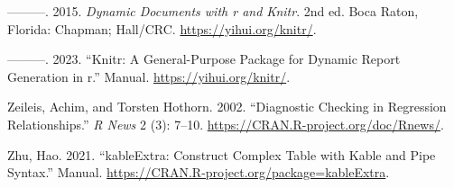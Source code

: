 \documentclass[
  letterpaper,
  paper =a4,
  twoside,
  openright,
  headsepline,
  footsepline,
  listof = totocnumbered,
  chapterprefix = true,
  firstiscover,
  parskip = full*]{scrbook}
\newlength{\cslhangindent}
\newenvironment{CSLReferences}[2] %
 {\begin{list}{}{%
  \setlength{\itemindent}{0pt}
  \setlength{\leftmargin}{0pt}
  \setlength{\parsep}{0pt}
  \ifodd #1
   \setlength{\leftmargin}{\cslhangindent}
   \setlength{\itemindent}{-1\cslhangindent}
  \fi
  \setlength{\itemsep}{#2\baselineskip}}}
 {\end{list}}
\begin{document}
\begin{CSLReferences}{1}{0}
---------. 2015. \emph{Dynamic Documents with r and Knitr}. 2nd ed. Boca
Raton, Florida: Chapman; Hall/{CRC}. \url{https://yihui.org/knitr/}.

---------. 2023. {``Knitr: A General-Purpose Package for Dynamic Report
Generation in r.''} Manual. \url{https://yihui.org/knitr/}.

Zeileis, Achim, and Torsten Hothorn. 2002. {``Diagnostic Checking in
Regression Relationships.''} \emph{R News} 2 (3): 7--10.
\url{https://CRAN.R-project.org/doc/Rnews/}.

Zhu, Hao. 2021. {``{kableExtra}: Construct Complex Table with Kable and
Pipe Syntax.''} Manual.
\url{https://CRAN.R-project.org/package=kableExtra}.

\end{CSLReferences}


\backmatter
\end{document}
